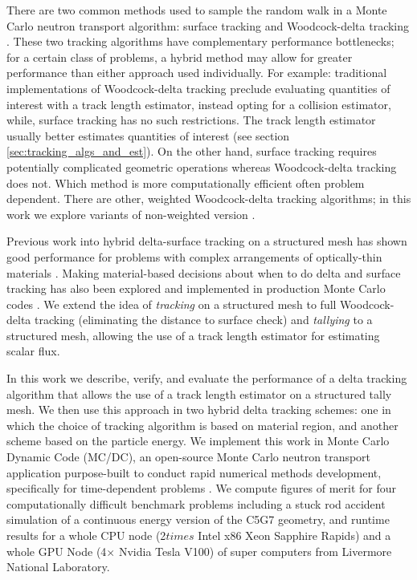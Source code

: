 There are two common methods used to sample the random walk in a Monte Carlo neutron transport algorithm: surface tracking \cite{lewis_computational_1984} and Woodcock-delta tracking \cite{woodcock_techniques_1965}.
These two tracking algorithms have complementary performance bottlenecks; for a certain class of problems, a hybrid method may allow for greater performance than either approach used individually.
For example: traditional implementations of Woodcock-delta tracking preclude evaluating quantities of interest with a track length estimator, instead opting for a collision estimator, while, surface tracking has no such restrictions.
The track length estimator usually better estimates quantities of interest (see section \ref{sec:tracking_algs_and_est}).
On the other hand, surface tracking requires potentially complicated geometric operations whereas Woodcock-delta tracking does not.
Which method is more computationally efficient often problem dependent.
There are other, weighted Woodcock-delta tracking algorithms; in this work we explore variants of non-weighted version \cite{molnar_variance_2018, morgan_weighted-delta-tracking_2015}.


Previous work into hybrid delta-surface tracking on a structured mesh has shown good performance for problems with complex arrangements of optically-thin materials \cite{morgan2023delta}.
Making material-based decisions about when to do delta and surface tracking has also been explored and implemented in production Monte Carlo codes \cite{leppanen_development_2013, leppanen_2010_burnup, richards_monk_2015}.
We extend the idea of \textit{tracking} on a structured mesh to full Woodcock-delta tracking (eliminating the distance to surface check) and \textit{tallying} to a structured mesh, allowing the use of a track length estimator for estimating scalar flux.

In this work we describe, verify, and evaluate the performance of a delta tracking algorithm that allows the use of a track length estimator on a structured tally mesh.
We then use this approach in two hybrid delta tracking schemes: one in which the choice of tracking algorithm is based on material region, and another scheme based on the particle energy.
We implement this work in Monte Carlo Dynamic Code (MC/DC), an open-source Monte Carlo neutron transport application purpose-built to conduct rapid numerical methods development, specifically for time-dependent problems \cite{morgan_monte_2024}.
We compute figures of merit for four computationally difficult benchmark problems including a stuck rod accident simulation of a continuous energy version of the C5G7 geometry, and runtime results for a whole CPU node (2$times$ Intel x86 Xeon Sapphire Rapids) and a whole GPU Node (4$\times$ Nvidia Tesla V100) of super computers from Livermore National Laboratory.

